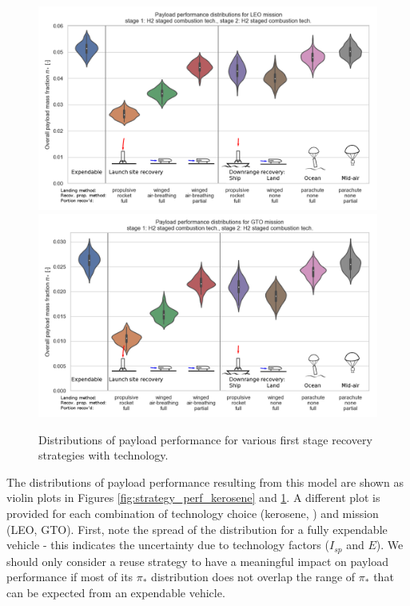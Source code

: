 \documentclass{iaf-iac}
\begin{document}
\begin{multicols}{2}
\begin{figure}
    \centering
    \includegraphics[width=\textwidth]{strategy_perf_annotated/LEO_H2}
    \includegraphics[width=\textwidth]{strategy_perf_annotated/GTO_H2}
    \caption{\label{fig:strategy_perf_H2} Distributions of payload performance for various first stage recovery strategies with  technology.}
\end{figure}

The distributions of payload performance resulting from this model are shown as violin plots in Figures \ref{fig:strategy_perf_kerosene} and \ref{fig:strategy_perf_H2}. A different plot is provided for each combination of technology choice (kerosene, ) and mission (LEO, GTO). First, note the spread of the distribution for a fully expendable vehicle - this indicates the uncertainty due to technology factors ($I_{sp}$ and $E$). We should only consider a reuse strategy to have a meaningful impact on payload performance if most of its $\pi_*$ distribution does not overlap the range of $\pi_*$ that can be expected from an expendable vehicle.


\end{multicols}
\end{document}

